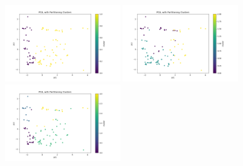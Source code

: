\documentclass{article}
\begin{document}
\begin{figure}[h]
\centering
\includegraphics[width=0.45\textwidth]{./pca_p_k2.png}
\includegraphics[width=0.45\textwidth]{./pca_p_k3.png}
\includegraphics[width=0.45\textwidth]{./pca_p_k4.png}
\end{figure}
\end{document}
